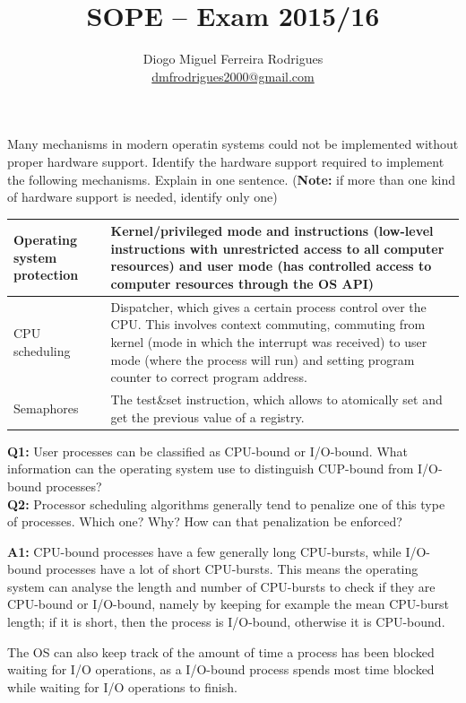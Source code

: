 \documentclass{sope}
\title{SOPE -- Exam 2015/16}
\author{Diogo Miguel Ferreira Rodrigues \\ \href{mailto:dmfrodrigues2000@gmail.com}{dmfrodrigues2000@gmail.com}}
\begin{document}
\setcounter{chapter}{15}
Many mechanisms in modern operatin systems could not be implemented without proper hardware support. Identify the hardware support required to implement the following mechanisms. Explain in one sentence. (\textbf{Note:} if more than one kind of hardware support is needed, identify only one)

\ansseparator

\begin{center}
    \begin{tabular}{p{20mm} | p{131mm}}
        Operating system protection & Kernel/privileged mode and instructions (low-level instructions with unrestricted access to all computer resources) and user mode (has controlled access to computer resources through the OS API)\\ \hline
        CPU scheduling & Dispatcher, which gives a certain process control over the CPU. This involves context commuting, commuting from kernel (mode in which the interrupt was received) to user mode (where the process will run) and setting program counter to correct program address. \\ \hline
        Semaphores & The test\&set instruction, which allows to atomically set and get the previous value of a registry.
    \end{tabular}
\end{center}

\textbf{Q1:} User processes can be classified as CPU-bound or I/O-bound. What information can the operating system use to distinguish CUP-bound from I/O-bound processes?\\
\textbf{Q2:} Processor scheduling algorithms generally tend to penalize one of this type of processes. Which one? Why? How can that penalization be enforced?

\ansseparator

\textbf{A1:} CPU-bound processes have a few generally long CPU-bursts, while I/O-bound processes have a lot of short CPU-bursts. This means the operating system can analyse the length and number of CPU-bursts to check if they are CPU-bound or I/O-bound, namely by keeping for example the mean CPU-burst length; if it is short, then the process is I/O-bound, otherwise it is CPU-bound.

The OS can also keep track of the amount of time a process has been blocked waiting for I/O operations, as a I/O-bound process spends most time blocked while waiting for I/O operations to finish.
\end{document}

